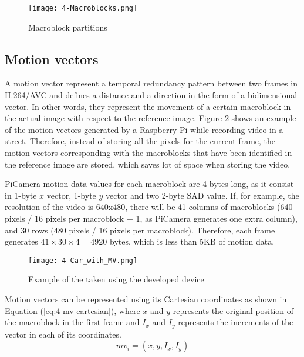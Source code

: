 \begin{figure}[!h]
	\begin{center}
		\texttt{[image: 4-Macroblocks.png]}
		\caption{Macroblock partitions}
		\label{fig:4-Macroblocks}
	\end{center}
\end{figure}


\subsection{Motion vectors}
A motion vector represent a temporal redundancy pattern between two frames in H.264/AVC and defines a distance and a direction in the form of a bidimensional vector. In other words, they represent the movement of a certain macroblock in the actual image with respect to the reference image. Figure \ref{fig:4-Car_with_MV} shows an example of the motion vectors generated by a Raspberry Pi while recording video in a street. Therefore, instead of storing all the pixels for the current frame, the motion vectors corresponding with the macroblocks that have been identified in the reference image are stored, which saves lot of space when storing the video.

PiCamera motion data values for each macroblock are 4-bytes long, as it consist in 1-byte $x$ vector, 1-byte $y$ vector and two 2-byte \ac{SAD} value. If, for example, the resolution of the video is 640x480, there will be 41 columns of macroblocks (640 pixels / 16 pixels per macroblock + 1, as PiCamera generates one extra column), and 30 rows (480 pixels / 16 pixels per macroblock). Therefore, each frame generates $41\times30\times4 = 4920$ bytes, which is less than 5KB of motion data.

\begin{figure}[!h]
	\begin{center}
		\texttt{[image: 4-Car\_with\_MV.png]}
		\caption{Example of  the  taken using the developed device}
		\label{fig:4-Car_with_MV}
	\end{center}
\end{figure}

Motion vectors can be represented using its Cartesian coordinates as shown in Equation (\ref{eq:4-mv-cartesian}), where $x$ and $y$ represents the original position of the macroblock in the first frame and $I_{x}$ and $I_{y}$ represents the increments of the vector in each of its coordinates.
\begin{equation} \label{eq:4-mv-cartesian}
mv_{i} = (x, y, I_{x}, I_{y})
\end{equation}

